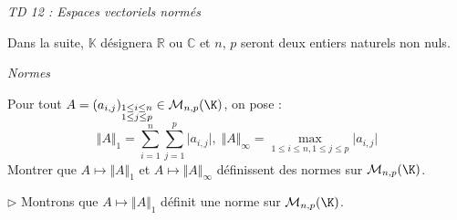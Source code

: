 \documentclass[a4paper,10pt]{report}
\begin{document}
\everymath{\displaystyle}

\begin{center}
\textit{{ {\huge TD 12 : Espaces vectoriels normés}}}
\end{center}


\bigskip

\noindent Dans la suite, $\mathbb{K}$ désignera $\mathbb{R}$ ou $\mathbb{C}$ et $n$, $p$ seront deux entiers naturels non nuls.

\medskip

\begin{center}
\textit{{ {\large Normes}}}
\end{center}

\medskip



\begin{Exercice}{} Pour tout $A = (a_{i,j})_{\substack{1 \leq i \leq n \\ 1 \leq j \leq p}} \in \mathcal{M}_{n,p}(\K)$, on pose :
$$\Vert A \Vert_{1}  = \sum_{i = 1}^{n} \sum_{j = 1}^{p} \vert a_{i,j} \vert, \; \Vert A \Vert_{\infty}  = \max_{1 \leq i \leq n,1 \leq j \leq p} \vert a_{i,j} \vert $$
Montrer que $A \mapsto \Vert A \Vert_{1}$ et $A \mapsto \Vert A \Vert_{\infty}$ définissent des normes sur $\mathcal{M}_{n,p}(\K)$.
\end{Exercice}

\corr 

\noindent $\rhd$ Montrons que $A \mapsto \Vert A \Vert_{1}$ définit une norme sur $\mathcal{M}_{n,p}(\K)$.
\end{document}
